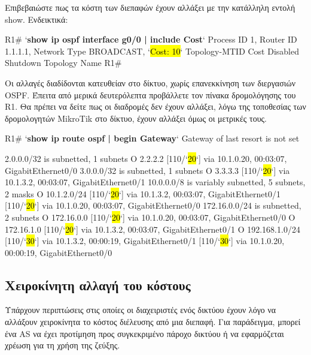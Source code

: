 \documentclass{EdipyLabs} %
\begin{document}
Επιβεβαιώστε πως τα κόστη των διεπαφών έχουν αλλάξει με την κατάλληλη εντολή show. Ενδεικτικά:

\begin{CommandBox}
R1# `\textbf{show ip ospf interface g0/0 | include Cost}`
  Process ID 1, Router ID 1.1.1.1, Network Type BROADCAST, `\hl{Cost: 10}`
  Topology-MTID	Cost	Disabled	Shutdown	Topology Name
R1#
\end{CommandBox}

Οι αλλαγές διαδίδονται κατευθείαν στο δίκτυο, χωρίς επανεκκίνηση των διεργασιών OSPF. Έπειτα από μερικά δευτερόλεπτα προβάλλετε τον πίνακα δρομολόγησης του R1. Θα πρέπει να δείτε πως οι διαδρομές δεν έχουν αλλάξει, λόγω της τοποθεσίας των δρομολογητών MikroTik στο δίκτυο, έχουν αλλάξει όμως οι μετρικές τους.

{\small
\begin{CommandBox}
R1# `\textbf{show ip route ospf | begin Gateway}`
Gateway of last resort is not set

      2.0.0.0/32 is subnetted, 1 subnets
O        2.2.2.2 [110/`\hl{20}`] via 10.1.0.20, 00:03:07, GigabitEthernet0/0
      3.0.0.0/32 is subnetted, 1 subnets
O        3.3.3.3 [110/`\hl{20}`] via 10.1.3.2, 00:03:07, GigabitEthernet0/1
      10.0.0.0/8 is variably subnetted, 5 subnets, 2 masks
O        10.1.2.0/24 [110/`\hl{20}`] via 10.1.3.2, 00:03:07, GigabitEthernet0/1
                     [110/`\hl{20}`] via 10.1.0.20, 00:03:07, GigabitEthernet0/0
      172.16.0.0/24 is subnetted, 2 subnets
O        172.16.0.0 [110/`\hl{20}`] via 10.1.0.20, 00:03:07, GigabitEthernet0/0
O        172.16.1.0 [110/`\hl{20}`] via 10.1.3.2, 00:03:07, GigabitEthernet0/1
O     192.168.1.0/24 [110/`\hl{30}`] via 10.1.3.2, 00:00:19, GigabitEthernet0/1
                     [110/`\hl{30}`] via 10.1.0.20, 00:00:19, GigabitEthernet0/0

\end{CommandBox}}


\subsection{Χειροκίνητη αλλαγή του κόστους}
Υπάρχουν περιπτώσεις στις οποίες οι διαχειριστές ενός δικτύου έχουν λόγο να αλλάξουν χειροκίνητα το κόστος διέλευσης από μια διεπαφή. Για παράδειγμα, μπορεί ένα AS να έχει προτίμηση προς συγκεκριμένο πάροχο δικτύου ή να εφαρμόζεται χρέωση για τη χρήση της ζεύξης.
\end{document}
